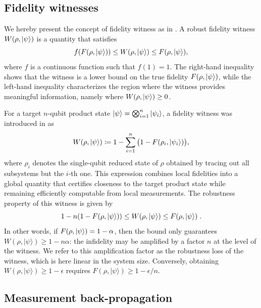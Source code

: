 \documentclass[a4paper,twocolumn,11pt,unpublished]{quantumarticle}
\begin{document}
\subsection{Fidelity witnesses}
\label{subsection:prelims:witness}
We hereby present the concept of fidelity witness as in \cite{CGKM21efficient, UC24efficient}. A {robust fidelity witness} $W(\rho, \ket{\psi})$ is a quantity that satisfies
\begin{equation}
\label{eq: robust fidelity witness}
    f(F(\rho, \ket{\psi}))
    \leq W(\rho, \ket{\psi}) 
    \leq F(\rho, \ket{\psi}) ,
\end{equation}
where $f$ is a continuous function such that $f(1) = 1$. 
The right-hand inequality shows that the witness is a {lower bound} on the true fidelity $F(\rho, \ket{\psi})$, while the left-hand inequality characterizes the region where the witness provides meaningful information, namely where $W(\rho, \ket{\psi}) \ge 0$.

For a target $n$-qubit product state $\ket{\psi}=\bigotimes_{i=1}^n\ket{\psi_i}$, a fidelity witness was introduced in \cite{CGKM21efficient} as
\begin{equation}
    \label{eq:prelims:witness}
    W(\rho, \ket{\psi}) 
    \coloneqq 1 - 
    \sum_{i=1}^{n}
    \big(1 - F(\rho_i, \ket{\psi_i})\big),
\end{equation}
where $\rho_i$ denotes the single-qubit reduced state of $\rho$ obtained by tracing out all subsystems but the $i$-th one.
This expression combines local fidelities into a global quantity that certifies closeness to the target product state while remaining efficiently computable from local measurements. The {robustness} property of this witness is given by \cite{CGKM21efficient}
\begin{equation}
    \label{eq:prelims:witness:robustness}
    1-n(1-F(\rho, \ket\psi)) \leq W(\rho, \ket\psi)\leq F(\rho, \ket\psi)\; .
\end{equation}
In other words, if $F(\rho,\ket\psi)=1-\alpha$, then the bound only guarantees $W(\rho,|\psi\rangle)\geq 1-n\alpha$: the infidelity may be amplified by a factor $n$ at the level of the witness. We refer to this amplification factor as the robustness loss of the witness, which is here linear in the system size. Conversely, obtaining $W(\rho,|\psi\rangle)\geq 1-\epsilon$ requires $F(\rho,|\psi\rangle)\geq 1-\epsilon/n$.


\subsection{Measurement back-propagation}
\label{subsection:prelims:backprop}
 
\end{document}
